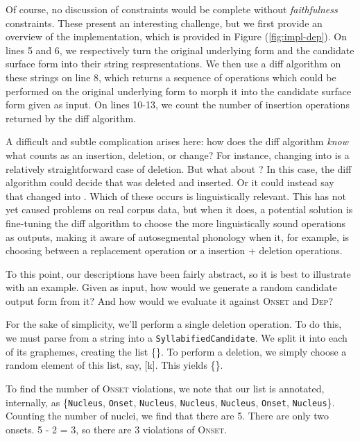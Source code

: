\documentclass[12pt]{article}
\newcommand{\dep}{\textsc{Dep}}
\newcommand{\onset}{\textsc{Onset}}
\newcommand{\pref}[1]{(\ref{#1})}
\begin{document}
Of course, no discussion of constraints would be complete without
\textit{faithfulness} constraints. These present an interesting challenge,
but we first provide an overview of the implementation, which is provided
in Figure \pref{fig:impl-dep}. On lines 5 and 6, we respectively turn the
original underlying form and the candidate surface form into their string
respresentations. We then use a diff algorithm on these strings on line 8,
which returns a sequence of operations which could be performed on the
original underlying form to morph it into the candidate surface form given
as input. On lines 10-13, we count the number of insertion operations
returned by the diff algorithm.

A difficult and subtle complication arises here: how does the diff
algorithm \textit{know} what counts as an insertion, deletion, or change?
For instance, changing  into
\textipa{[ow\'ok\'ow\'o]} is a relatively straightforward case of
deletion. But what about \textipa{[ow\'ak\'iow\'o]}? In this case, the
diff algorithm could decide that \textipa{[\'o]} was deleted and
\textipa{[\'a]} inserted. Or it could instead say that \textipa{[\'o]}
changed into \textipa{[\'a]}. Which of these occurs is linguistically
relevant. This has not yet caused problems on real corpus data, but
when it does, a potential solution is fine-tuning the diff algorithm
to choose the more linguistically sound operations as outputs, making
it aware of autosegmental phonology when it, for example, is choosing
between a replacement operation or a insertion + deletion operations.

To this point, our descriptions have been fairly abstract, so it is best
to illustrate with an example. Given  as
input, how would we generate a random candidate output form from it?
And how would we evaluate it against \onset{} and \dep?

For the sake of simplicity, we'll perform a single deletion operation.
To do this, we must parse  from a string
into a \texttt{SyllabifiedCandidate}. We split it into each of its
graphemes, creating the list \{\}. To
perform a deletion, we simply choose a random element of this list,
say, [k]. This yields \{\}.

To find the number of \onset{} violations, we note that our list is
annotated, internally, as \{\texttt{Nucleus}, \texttt{Onset},
\texttt{Nucleus}, \texttt{Nucleus}, \texttt{Nucleus}, \texttt{Onset},
\texttt{Nucleus}\}. Counting the number of nuclei, we find that there
are 5. There are only two onsets. 5 - 2 = 3, so there are 3
violations of \onset.
\end{document}
